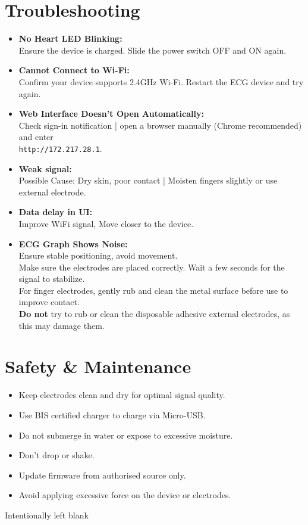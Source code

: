 \documentclass[twoside]{article}
\begin{document}
\section{Troubleshooting}
\begin{itemize}
    \item \textbf{No Heart LED Blinking:} \\
    Ensure the device is charged. Slide the power switch OFF and ON again.

    \item \textbf{Cannot Connect to Wi-Fi:} \\
    Confirm your device supports 2.4GHz Wi-Fi. Restart the ECG device and try again.

    \item \textbf{Web Interface Doesn’t Open Automatically:} \\
    Check sign-in notification | open a browser manually (Chrome recommended) and enter\\ \texttt{http://172.217.28.1}.

    \item \textbf{Weak signal:} \\
    Possible Cause: Dry skin, poor contact | Moisten fingers slightly or use external electrode.

    \item \textbf{Data delay in UI:} \\
    Improve WiFi signal, Move closer to the device.

    \item \textbf{ECG Graph Shows Noise:} \\
    Ensure stable positioning, avoid movement. \\
    Make sure the electrodes are placed correctly. Wait a few seconds for the signal to stabilize. \\
    For finger electrodes, gently rub and clean the metal surface before use to improve contact. \\
    \textbf{Do not} try to rub or clean the disposable adhesive external electrodes, as this may damage them.
\end{itemize}

\section{Safety \& Maintenance}
\begin{itemize}[leftmargin=*]
  \item Keep electrodes clean and dry for optimal signal quality.
  \item Use BIS certified charger to charge via Micro-USB.
  \item Do not submerge in water or expose to excessive moisture.
  \item Don't drop or shake.
  \item Update firmware from authorised source only.
  \item Avoid applying excessive force on the device or electrodes.
\end{itemize}
\newpage
Intentionally left blank
\thispagestyle{empty}
\newpage
\end{document}
